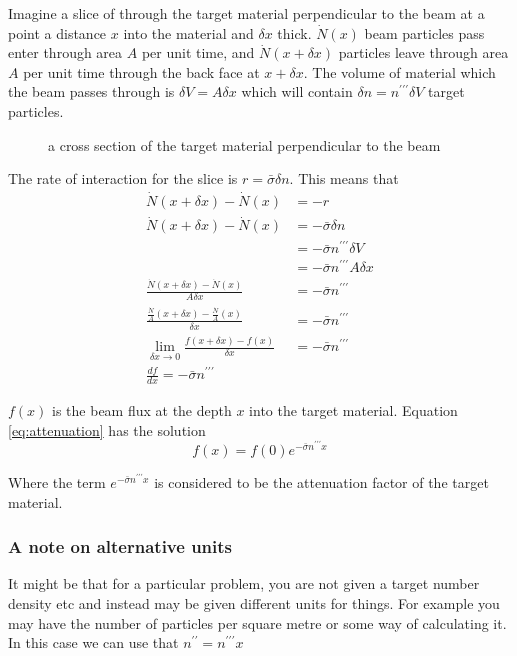 Imagine a slice of through the target material perpendicular to the beam at a point a distance $x$ into the material and $\delta x$ thick.
$\dot{N}(x)$ beam particles pass enter through area $A$ per unit time, and $\dot{N}(x+\delta x)$ particles leave through area $A$ per unit time through the back face at $x+\delta x$.
The volume of material which the beam passes through is $\delta V=A \delta x$ which will contain $\delta n = n^{\prime\prime\prime}\delta V$ target particles.
\begin{figure}[h]
  \centering

\caption{a cross section of the target material perpendicular to the beam} \label{fig:attenuation}
\end{figure}
The rate of interaction for the slice is $r=\bar{\sigma} \delta n$. This means that
\begin{subequations}
\begin{align}
\dot{N}(x+\delta x) - \dot{N}(x) &=-r\\
\dot{N}(x+\delta x) - \dot{N}(x) &=-\bar{\sigma} \delta n\\
 &=-\bar{\sigma} n^{\prime\prime\prime} \delta V\\
 &=-\bar{\sigma} n^{\prime\prime\prime} A \delta x\\
 \frac{\dot{N}(x+\delta x) - \dot{N}(x)}{A \delta x} &= -\bar{\sigma} n^{\prime\prime\prime}\\
 \frac{\frac{\dot{N}}{A}(x+\delta x) - \frac{\dot{N}}{A}(x)}{\delta x} &= -\bar{\sigma} n^{\prime\prime\prime} \\
\lim_{\delta x \to 0} \frac{f(x+\delta x) - f(x)}{\delta x} &= -\bar{\sigma} n^{\prime\prime\prime}\\
\frac{df}{dx} = -\bar{\sigma} n^{\prime\prime\prime} \label{eq:attenuation}
\end{align}
\end{subequations}

$f(x)$ is the beam flux at the depth $x$ into the target material. Equation \ref{eq:attenuation} has the solution
\begin{equation}
  \label{eq:attenuation_solution}
f(x)=f(0)e^{-\bar{\sigma}n^{\prime\prime\prime}x}
\end{equation}

Where the term $e^{-\bar{\sigma}n^{\prime\prime\prime}x}$ is considered to be the attenuation factor of the target material.
\subsubsection{A note on alternative units}
It might be that for a particular problem, you are not given a target number density etc and instead may be given different units for things. For example you may have the number of particles per square metre or some way of calculating it. In this case we can use that $n^{\prime\prime}=n^{\prime\prime\prime}x$

